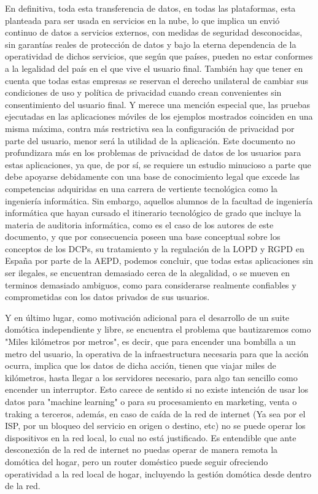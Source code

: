 En definitiva, toda esta transferencia de datos, en todas las plataformas, esta planteada para ser usada en servicios en la nube, lo que implica un envió continuo de datos a servicios externos, con medidas de seguridad desconocidas, sin garantías reales de protección de datos y bajo la eterna dependencia de la operatividad de dichos servicios, que según que países, pueden no estar conformes a la legalidad del país en el que vive el usuario final. También hay que tener en cuenta que todas estas empresas se reservan el derecho unilateral de cambiar sus condiciones de uso y política de privacidad cuando crean convenientes sin consentimiento del usuario final. Y merece una mención especial que, las pruebas ejecutadas en las aplicaciones móviles de los ejemplos mostrados coinciden en una misma máxima, contra más restrictiva sea la configuración de privacidad por parte del usuario, menor será la utilidad de la aplicación. Este documento no profundizara más en los problemas de privacidad de datos de los usuarios para estas aplicaciones, ya que, de por sí, se requiere un estudio minucioso a parte que debe apoyarse debidamente con una base de conocimiento legal que excede las competencias adquiridas en una carrera de vertiente tecnológica como la ingeniería informática. Sin embargo, aquellos alumnos de la facultad de ingeniería informática que hayan cursado el itinerario tecnológico de grado que incluye la materia de auditoria informática, como es el caso de los autores de este documento, y que por consecuencia poseen una base conceptual sobre los conceptos de los DCPs, su tratamiento y la regulación de la LOPD y RGPD en España por parte de la AEPD, podemos concluir, que todas estas aplicaciones sin ser ilegales, se encuentran demasiado cerca de la alegalidad, o se mueven en terminos demasiado ambiguos, como para considerarse realmente confiables y comprometidas con los datos privados de sus usuarios.

Y en último lugar, como motivación adicional para el desarrollo de un suite domótica independiente y libre, se encuentra el problema que bautizaremos como "Miles kilómetros por metros", es decir, que para encender una bombilla a un metro del usuario, la operativa de la infraestructura necesaria para que la acción ocurra, implica que los datos de dicha acción, tienen que viajar miles de kilómetros, hasta llegar a los servidores necesario, para algo tan sencillo como encender un interruptor. Esto carece de sentido si no existe intención de usar los datos para "machine learning" o para su procesamiento en marketing, venta o traking a terceros, además, en caso de caída de la red de internet (Ya sea por el ISP, por un bloqueo del servicio en origen o destino, etc) no se puede operar los dispositivos en la red local, lo cual no está justificado. Es entendible que ante desconexión de la red de internet no puedas operar de manera remota la domótica del hogar, pero un router doméstico puede seguir ofreciendo operatividad a la red local de hogar, incluyendo la gestión domótica desde dentro de la red.

